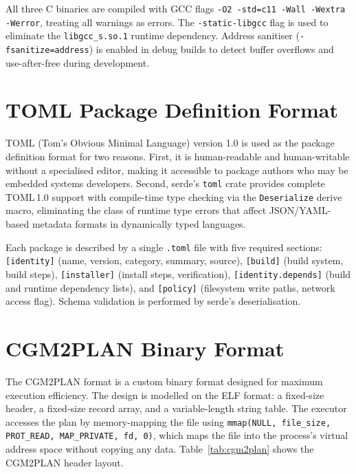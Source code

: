 \documentclass[12pt,a4paper]{report}
\begin{document}
All three C binaries are compiled with GCC flags
\texttt{-O2 -std=c11 -Wall -Wextra -Werror}, treating all warnings as errors.
The \texttt{-static-libgcc} flag is used to eliminate the \texttt{libgcc\_s.so.1}
runtime dependency. Address sanitiser (\texttt{-fsanitize=address}) is enabled in
debug builds to detect buffer overflows and use-after-free during development.

\section{TOML Package Definition Format}

TOML (Tom's Obvious Minimal Language) version 1.0 \cite{toml} is used as the
package definition format for two reasons. First, it is human-readable and
human-writable without a specialised editor, making it accessible to package
authors who may be embedded systems developers. Second, serde's \texttt{toml}
crate provides complete TOML\,1.0 support with compile-time type checking via the
\texttt{Deserialize} derive macro, eliminating the class of runtime type errors
that affect JSON/YAML-based metadata formats in dynamically typed languages.

Each package is described by a single \texttt{.toml} file with five required
sections: \texttt{[identity]} (name, version, category, summary, source),
\texttt{[build]} (build system, build steps), \texttt{[installer]} (install steps,
verification), \texttt{[identity.depends]} (build and runtime dependency lists),
and \texttt{[policy]} (filesystem write paths, network access flag). Schema
validation is performed by serde's deserialisation.

\section{CGM2PLAN Binary Format}

The CGM2PLAN format is a custom binary format designed for maximum execution
efficiency. The design is modelled on the ELF format: a fixed-size header, a
fixed-size record array, and a variable-length string table. The executor accesses
the plan by memory-mapping the file using \texttt{mmap(NULL, file\_size,
PROT\_READ, MAP\_PRIVATE, fd, 0)}, which maps the file into the process's virtual
address space without copying any data. Table~\ref{tab:cgm2plan} shows the
CGM2PLAN header layout.
\end{document}
